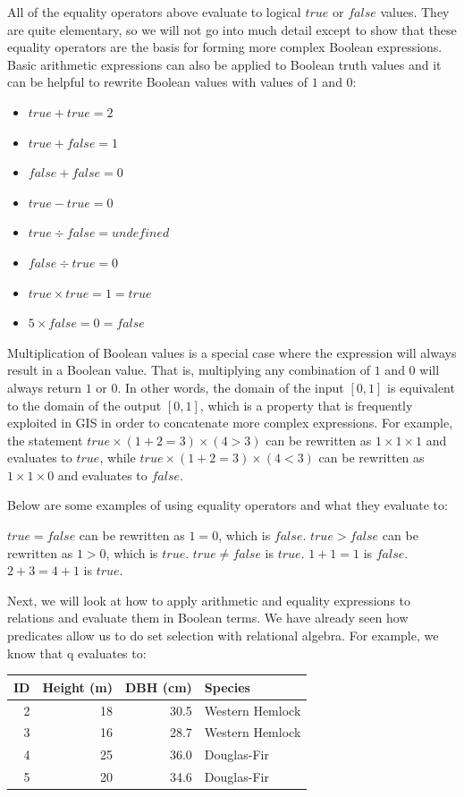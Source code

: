 \documentclass[
]{book}
\providecommand{\tightlist}{%
  \setlength{\itemsep}{0pt}\setlength{\parskip}{0pt}}
\begin{document}
All of the equality operators above evaluate to logical \(true\) or \(false\) values. They are quite elementary, so we will not go into much detail except to show that these equality operators are the basis for forming more complex Boolean expressions. Basic arithmetic expressions can also be applied to Boolean truth values and it can be helpful to rewrite Boolean values with values of \(1\) and \(0\):

\begin{itemize}
\tightlist
\item
  \(true+true=2\)
\item
  \(true+false=1\)
\item
  \(false+false=0\)
\item
  \(true-true=0\)
\item
  \(true÷false=undefined\)
\item
  \(false÷true=0\)
\item
  \(true×true=1=true\)
\item
  \(5×false=0=false\)
\end{itemize}

Multiplication of Boolean values is a special case where the expression will always result in a Boolean value. That is, multiplying any combination of \(1\) and \(0\) will always return \(1\) or \(0\). In other words, the domain of the input \([0,1]\) is equivalent to the domain of the output \([0,1]\), which is a property that is frequently exploited in GIS in order to concatenate more complex expressions. For example, the statement \(true×(1+2=3)×(4>3)\) can be rewritten as \(1×1×1\) and evaluates to \(true\), while \(true×(1+2=3)×(4<3)\) can be rewritten as \(1×1×0\) and evaluates to \(false\).

Below are some examples of using equality operators and what they evaluate to:

\(true=false\) can be rewritten as \(1=0\), which is \(false\).
\(true>false\) can be rewritten as \(1>0\), which is \(true\).
\(true≠false\) is \(true\).
\(1+1=1\) is \(false\).
\(2+3=4+1\) is \(true\).

Next, we will look at how to apply arithmetic and equality expressions to relations and evaluate them in Boolean terms. We have already seen how predicates allow us to do set selection with relational algebra. For example, we know that q evaluates to:

\begin{tabular}{rrrl}
\toprule
ID & Height (m) & DBH (cm) & Species\\
\midrule
2 & 18 & 30.5 & Western Hemlock\\
3 & 16 & 28.7 & Western Hemlock\\
4 & 25 & 36.0 & Douglas-Fir\\
5 & 20 & 34.6 & Douglas-Fir\\
\bottomrule
\end{tabular}
\end{document}
